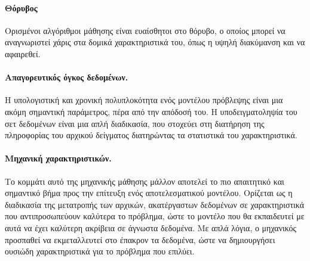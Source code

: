 \documentclass{article}
\begin{document}
\paragraph{Θόρυβος} Ορισμένοι αλγόριθμοι μάθησης είναι ευαίσθητοι στο θόρυβο, ο οποίος μπορεί να αναγνωριστεί χάρις στα δομικά χαρακτηριστικά του, όπως η υψηλή διακύμανση και να αφαιρεθεί.

\paragraph{Απαγορευτικός όγκος δεδομένων.} Η υπολογιστική και χρονική πολυπλοκότητα ενός μοντέλου πρόβλεψης είναι μια ακόμη σημαντική παράμετρος, πέρα από την απόδοσή του. Η υποδειγματοληψία του σετ δεδομένων είναι μια απλή διαδικασία, που στοχεύει στη διατήρηση της πληροφορίας του αρχικού δείγματος διατηρώντας τα στατιστικά του χαρακτηριστικά.

\paragraph{Μηχανική χαρακτηριστικών.} Το κομμάτι αυτό της μηχανικής μάθησης μάλλον αποτελεί το πιο απαιτητικό και σημαντικό βήμα προς την επίτευξη ενός αποτελεσματικού μοντέλου. Ορίζεται ως η διαδικασία της μετατροπής των αρχικών, ακατέργαστων δεδομένων σε χαρακτηριστικά που αντιπροσωπεύουν καλύτερα το πρόβλημα, ώστε το μοντέλο που θα εκπαιδευτεί με αυτά να έχει καλύτερη ακρίβεια σε άγνωστα δεδομένα. Με απλά λόγια, ο μηχανικός προσπαθεί να εκμεταλλευτεί στο έπακρον τα δεδομένα, ώστε να δημιουργήσει ουσιώδη χαρακτηριστικά για το πρόβλημα που επιλύει.
\end{document}
